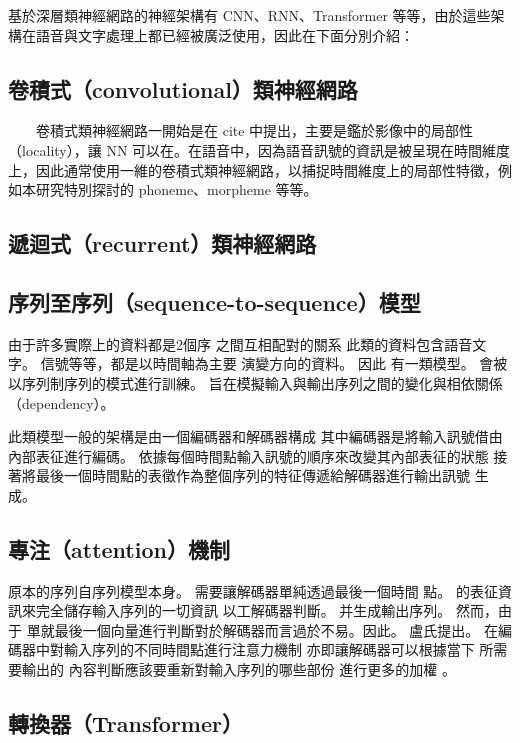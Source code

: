     基於深層類神經網路的神經架構有 CNN、RNN、Transformer 等等，由於這些架構在語音與文字處理上都已經被廣泛使用，因此在下面分別介紹：

\subsection{卷積式（convolutional）類神經網路}

　　卷積式類神經網路一開始是在 cite 中提出，主要是鑑於影像中的局部性（locality），讓 NN 可以在。在語音中，因為語音訊號的資訊是被呈現在時間維度上，因此通常使用一維的卷積式類神經網路，以捕捉時間維度上的局部性特徵，例如本研究特別探討的 phoneme、morpheme 等等。

\subsection{遞迴式（recurrent）類神經網路}

\subsection{
    序列至序列（sequence-to-sequence）模型}
    
    由于許多實際上的資料都是2個序 之間互相配對的關系 此類的資料包含語音文字。 信號等等，都是以時間軸為主要 演變方向的資料。 因此 有一類模型。 會被以序列制序列的模式進行訓練。 旨在模擬輸入與輸出序列之間的變化與相依關係（dependency）。

此類模型一般的架構是由一個編碼器和解碼器構成 其中編碼器是將輸入訊號借由內部表征進行編碼。 依據每個時間點輸入訊號的順序來改變其內部表征的狀態 接著將最後一個時間點的表徵作為整個序列的特征傳遞給解碼器進行輸出訊號 生成。 
    
\subsection{專注（attention）機制}
    
    原本的序列自序列模型本身。 需要讓解碼器單純透過最後一個時間 點。 的表征資訊來完全儲存輸入序列的一切資訊 以工解碼器判斷。 并生成輸出序列。 然而，由于 單就最後一個向量進行判斷對於解碼器而言過於不易。因此。 盧氏提出。 在編碼器中對輸入序列的不同時間點進行注意力機制 亦即讓解碼器可以根據當下 所需要輸出的 內容判斷應該要重新對輸入序列的哪些部份 進行更多的加權 。

    

\subsection{轉換器（Transformer）}

